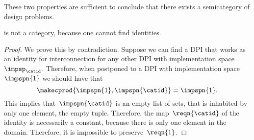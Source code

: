 These two properties are sufficient to conclude that there exists a semicategory of design problems.


\begin{lemma}
    \DPI is not a category, because one cannot find identities.
\end{lemma}
\begin{proof}
    We prove this by contradiction.
    Suppose we can find a DPI that works as an identity for interconnection for any other DPI with implementation space $\impsp_{\catid}$.
    Therefore, when postponed to a DPI with implementation space~$\impspn{1}$ we should have that
    \begin{equation}
        \makecprod{\impspn{1}, \impspn{\catid}} = \impspn{1}.
    \end{equation}
    This implies that~$\impspn{\catid}$ is an empty list of sets, that is inhabited by only one element, the empty tuple.
    Therefore, the map~$\reqn{\catid}$ of the identity is necessarily a constant, because there is only one element in the domain.
    Therefore, it is impossible to preserve~$\reqn{1}$.
\end{proof}



